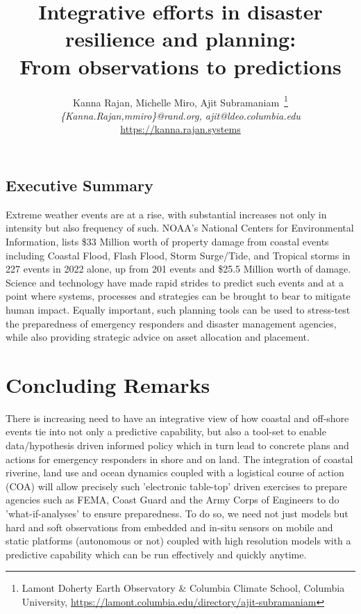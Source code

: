 \documentclass[11pt,letterpaper]{article}
\title{\Large{Integrative efforts in disaster resilience and planning:\\
    From observations to predictions}}
\author{\normalsize{Kanna Rajan, Michelle Miro, Ajit
      Subramaniam~\footnote{Lamont Doherty Earth Observatory \&
        Columbia Climate School, \newline Columbia University,
        \url{https://lamont.columbia.edu/directory/ajit-subramaniam}}
    }\\
  \emph{\{Kanna.Rajan,mmiro\}@rand.org, ajit@ldeo.columbia.edu}\\
  \url{https://kanna.rajan.systems}}
\begin{document}
\maketitle{}

\subsection*{Executive Summary}

Extreme weather events are at a rise, with substantial increases not
only in intensity but also frequency of such. NOAA's National Centers
for Environmental Information, lists \$33 Million worth of property
damage from coastal events including Coastal Flood, Flash Flood, Storm
Surge/Tide, and Tropical storms in 227 events in 2022 alone, up from
201 events and \$25.5 Million worth of damage. Science and technology
have made rapid strides to predict such events and at a point where
systems, processes and strategies can be brought to bear to mitigate
human impact. Equally important, such planning tools can be used to
stress-test the preparedness of emergency responders and disaster
management agencies, while also providing strategic advice on asset
allocation and placement. 






% 


\section*{Concluding Remarks}

There is increasing need to have an integrative view of how coastal
and off-shore events tie into not only a predictive capability, but
also a tool-set to enable data/hypothesis driven informed policy which
in turn lead to concrete plans and actions for emergency responders in
shore and on land. The integration of coastal riverine, land use and
ocean dynamics coupled with a logistical course of action (COA) will
allow precisely such 'electronic table-top' driven exercises to
prepare agencies such as FEMA, Coast Guard and the Army Corps of
Engineers to do 'what-if-analyses' to ensure preparedness. To do so,
we need not just models but hard and soft observations from embedded
and in-situ sensors on mobile and static platforms (autonomous or not)
coupled with high resolution models with a predictive capability which
can be run effectively and quickly anytime. 

% 
\end{document}
